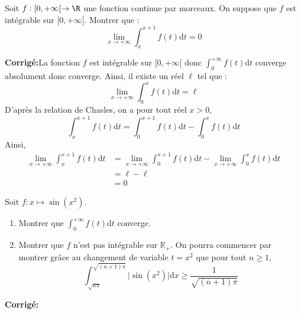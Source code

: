 \documentclass[a4paper,twoside,french,10pt]{VcCours}
\newcommand{\dx}{\text{d}x}
\newcommand{\dt}{\text{d}t}
\newcommand{\corr}{\textbf{Corrigé:}}
\begin{document}
\begin{Exercice}{}  Soit $f :[0, + \infty[ \rightarrow \R$ une fonction continue par morceaux.  On suppose que $f$ est intégrable sur $[0, + \infty[$.  Montrer que :
  \[
  \lim_{x \rightarrow + \infty} \int_{x}^{x + 1} f(t) \dt =0 
  \]
\end{Exercice}

\corr La fonction $f$ est intégrable sur $[0, + \infty[$ donc $\int_0^{+ \infty} f(t) \dt$ converge absolument donc converge. Ainsi, il existe un réel $\ell$ tel que :
$$ \lim_{x \rightarrow + \infty} \int_0^x f(t) \dt = \ell$$
D'après la relation de Chasles, on a pour tout réel $x>0$,
$$ \int_{x}^{x + 1} f(t) \dt = \int_{0}^{x + 1} f(t) \dt - \int_{0}^{x} f(t) \dt $$
Ainsi,
\begin{align*}
\lim_{x \rightarrow + \infty} \int_{x}^{x + 1} f(t) \dt & =\lim_{x \rightarrow + \infty}  \int_{0}^{x + 1} f(t) \dt - \lim_{x \rightarrow + \infty} \int_{0}^{x} f(t) \dt \\
& = \ell - \ell \\
& = 0
\end{align*}

\begin{Exercice}{}
Soit $f : x \mapsto \sin(x^2)$.
\begin{enumerate}
\item Montrer que $\int_{0}^{+ \infty}  f(t) \dt$ converge.
\item Montrer que $f$ n'est pas intégrable sur $\mathbb{R}_+$. On pourra commencer par montrer grâce au changement de variable $t=x^2$ que pour tout $n \geq 1$,
$$ \int_{\sqrt{n \pi}}^{\sqrt{(n+1)\pi}} \vert \sin(x^2) \vert \dx \geq \frac{1}{\sqrt{(n+1) \pi}}$$
\end{enumerate}
\end{Exercice}

\corr 
\end{document}
